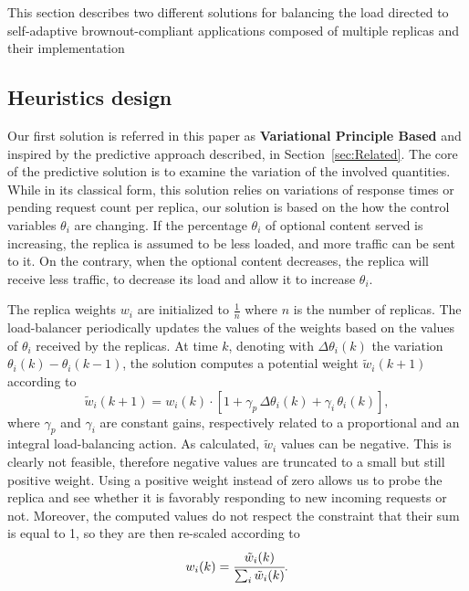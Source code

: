 This section describes two different solutions for balancing the
load directed to self-adaptive brownout-compliant applications
composed of multiple replicas and their implementation

\subsection{Heuristics design}

Our first solution is referred in this paper as \textbf{Variational
  Principle Based} and inspired by the predictive approach described,
in Section~\ref{sec:Related}. The core of the predictive solution is
to examine the variation of the involved quantities. While in its
classical form, this solution relies on variations of response times
or pending request count per replica, our solution is based on the how
the control variables $\theta_i$ are changing. If the percentage
$\theta_i$ of optional content served is increasing, the replica is
assumed to be less loaded, and more traffic can be sent to it. On the
contrary, when the optional content decreases, the replica will
receive less traffic, to decrease its load and allow it to increase
$\theta_i$.

The replica weights $w_i$ are initialized to $\frac{1}{n}$ where $n$
is the number of replicas. The load-balancer periodically updates the
values of the weights based on the values of $\theta_i$ received by
the replicas. At time $k$, denoting with $\Delta \theta_i (k)$ the
variation $\theta_i (k) - \theta_i (k-1)$, the solution computes a
potential weight $\tilde{w}_i(k+1)$ according to
\begin{equation}
  \tilde{w}_i(k+1) = w_i(k) \cdot 
  \left[ 1 + \gamma_p \, \Delta \theta_i (k) 
    + \gamma_i \, \theta_i (k) \right] ,
\label{eq:theta-diff}
\end{equation}
where $\gamma_p$ and $\gamma_i$ are constant gains, respectively
related to a proportional and an integral load-balancing action. As
calculated, $\tilde{w}_i$ values can be negative. This is clearly not
feasible, therefore negative values are truncated to a small but still
positive weight. Using a positive weight instead of zero allows us to
probe the replica and see whether it is favorably responding to new
incoming requests or not. Moreover, the computed values do not respect
the constraint that their sum is equal to 1, so they are then
re-scaled according to
\begin{equation}
  w_i (k) = \cfrac{\tilde{w}_i (k)}{\sum_i \tilde{w}_i (k)}.
\label{eq:theta-diff-rescale}
\end{equation}

